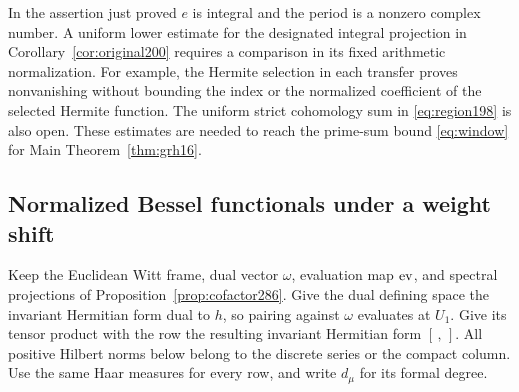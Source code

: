 \documentclass[a4paper,11pt]{article}
\theoremstyle{definition}
\theoremstyle{remark}
\numberwithin{equation}{section}
\begin{document}
In the assertion just proved \(e\) is integral and the period is
a nonzero complex number. A uniform lower estimate for the
designated integral projection in Corollary~\ref{cor:original200}
requires a comparison in its fixed arithmetic normalization.
For example, the Hermite selection in each transfer proves
nonvanishing without bounding the index or the normalized
coefficient of the selected Hermite function. The uniform
strict cohomology sum in \eqref{eq:region198} is also open.
These estimates are needed to reach the prime-sum bound
\eqref{eq:window} for Main Theorem~\ref{thm:grh16}.

\subsection{Normalized Bessel functionals under a weight shift}\label{nav:VII-54}
Keep the Euclidean Witt frame, dual vector \(\omega\), evaluation
map \({\rm ev}\), and spectral projections of
Proposition~\ref{prop:cofactor286}. Give the dual defining space
the invariant Hermitian form dual to \(h\), so pairing against
\(\omega\) evaluates at \(U_1\). Give its tensor product with
the row the resulting invariant Hermitian form \([\, ,\,]\).
All positive Hilbert norms below belong to the discrete series
or the compact column. Use the same Haar measures for every
row, and write \(d_\mu\) for its formal degree.
\end{document}
